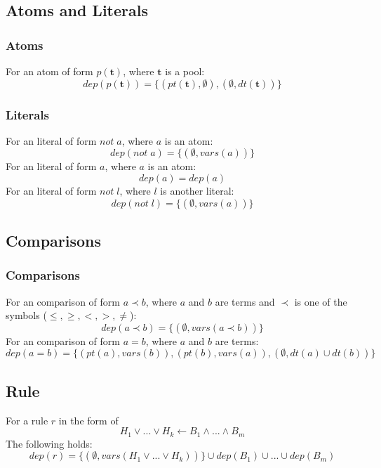 \documentclass{article}
\newcommand{\pool}[1]{\boldsymbol{#1}}
\newcommand{\set}[1]{\{#1\}}
\newcommand{\dep}[2]{\{(#1), (#2)\}}
\begin{document}
	\subsection{Atoms and Literals}
	\subsubsection{Atoms}
	For an atom of form $p(\pool{t})$, where $\pool{t}$ is a pool:
	\begin{equation}
		dep(p(\pool{t})) = \dep{pt(\pool{t}), \emptyset}{\emptyset, dt(\pool{t})}
	\end{equation}

	\subsubsection{Literals}
	For an literal of form $not \; a$, where $a$ is an atom:
	\begin{equation}
		dep(not \; a) = \set{(\emptyset, vars(a))}
	\end{equation}
	For an literal of form $a$, where $a$ is an atom:
	\begin{equation}
		dep(a) = dep(a)
	\end{equation}
	For an literal of form $not \; l$, where $l$ is another literal:
	\begin{equation}
		dep(not \; l) = \set{(\emptyset, vars(a))}
	\end{equation}

	\subsection{Comparisons}
	\subsubsection{Comparisons}
	For an comparison of form $a \prec b$, where $a$ and $b$ are terms and $\prec$ is one of the symbols ($\leq,\ge,<,>,\neq$):
	\begin{equation}
		dep(a \prec b) = \set{(\emptyset, vars(a \prec b))}
	\end{equation}
	For an comparison of form $a = b$, where $a$ and $b$ are terms:
	\begin{equation}
		dep(a = b) = \set{(pt(a), vars(b)), (pt(b), vars(a)), (\emptyset, dt(a) \cup dt(b))}
	\end{equation}

	\subsection{Rule}
	For a rule $r$ in the form of
	\begin{equation}
		H_1 \lor ... \lor H_k  \leftarrow B_1 \land ... \land B_m 
	\end{equation}
	The following holds:
	\begin{dmath}
		dep(r) = \set{(\emptyset, vars(H_1\vee ... \vee H_k))} \cup dep(B_1) \cup ... \cup dep(B_m)
	\end{dmath}
\end{document}
